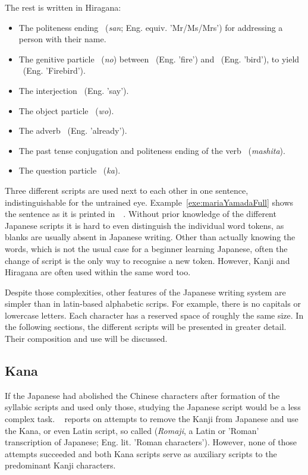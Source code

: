 The rest is written in Hiragana:
\begin{itemize}
  \item The politeness ending ~(\emph{san}; 
        Eng. equiv. 'Mr/Ms/Mrs') for addressing a person with their name.
  \item The genitive particle ~(\emph{no}) between 
        ~(Eng. 'fire') and ~(Eng. 'bird'), to yield 
        ~(Eng. 'Firebird').
  \item The interjection ~(Eng. 'say').
  \item The object particle ~(\emph{wo}).
  \item The adverb ~(Eng. 'already').
  \item The past tense conjugation and politeness ending of the 
        verb ~(\emph{mashita}).
  \item The question particle ~(\emph{ka}).
\end{itemize}

Three different scripts are used next to each other in one sentence,
indistinguishable for the untrained eye. Example~\ref{exe:mariaYamadaFull} 
shows the sentence as it is printed 
in~~\citeyear{Katsuki2006Book}. Without prior
knowledge of the different Japanese scripts it is hard to even distinguish
the individual word tokens, as blanks are usually absent in Japanese writing.
Other than actually knowing the words, which is not the usual case for a 
beginner learning Japanese, often the change of script is the only way to 
recognise a new token. However, Kanji and Hiragana are often used within the same
word too.

Despite those complexities, other features of the Japanese writing system are 
simpler than in latin-based alphabetic scrips. 
For example, there is no capitals or lowercase letters.
Each character has a reserved space of roughly the same size.
In the following sections, the different scripts will be presented in greater 
detail. Their composition and use will be discussed.

\subsection{Kana }
\label{sec:kana}

If the Japanese had abolished the Chinese characters after formation of the
syllabic scripts and used only those, studying the Japanese script would be
a less complex task. ~\citeyear{Lange1922} reports 
on attempts to remove the Kanji from Japanese and use the Kana, or even 
Latin script, so called  (\emph{Romaji}, a Latin or 'Roman' 
transcription of Japanese; Eng. lit. 'Roman characters'). 
However, none of those attempts succeeded and both Kana scripts serve as 
auxiliary scripts to the predominant Kanji characters. 

